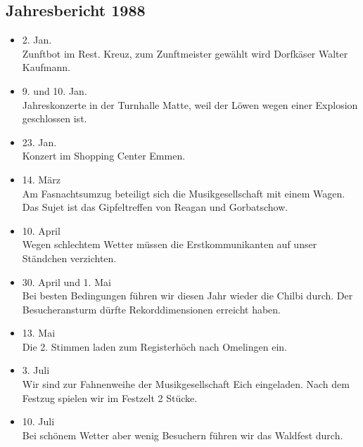 \subsection{Jahresbericht 1988}

\begin{history}


    \begin{itemize}

        \item[]2. Jan.\\
        Zunftbot im Rest. Kreuz, zum Zunftmeister gewählt wird Dorfkäser Walter
        Kaufmann.

        \item[]9. und 10. Jan.\\
        Jahreskonzerte in der Turnhalle Matte, weil der Löwen wegen einer
        Explosion geschlossen ist.

        \item[]23. Jan.\\
        Konzert im Shopping Center Emmen.

        \item[]14. März\\
        Am Fasnachtsumzug beteiligt sich die Musikgesellschaft mit einem Wagen.
        Das Sujet ist das Gipfeltreffen von Reagan und Gorbatschow.

        \item[]10. April\\
        Wegen schlechtem Wetter müssen die Erstkommunikanten auf unser Ständchen
        verzichten.

        \item[]30. April und 1. Mai\\
        Bei besten Bedingungen führen wir diesen Jahr wieder die Chilbi durch.
        Der Besucheransturm dürfte Rekorddimensionen erreicht haben.

        \item[]13. Mai\\
        Die 2. Stimmen laden zum Registerhöch nach Omelingen ein.

        \item[]3. Juli\\
        Wir sind zur Fahnenweihe der Musikgesellschaft Eich eingeladen. Nach dem
        Festzug spielen wir im Festzelt 2 Stücke.

        \item[]10. Juli\\
        Bei schönem Wetter aber wenig Besuchern führen wir das Waldfest durch.


\end{itemize}
\end{history}
